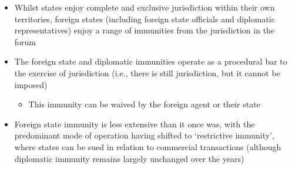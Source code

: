 \begin{itemize}
    \item Whilst states enjoy complete and exclusive jurisdiction within their own territories, foreign states (including foreign state officials and diplomatic representatives) enjoy a range of immunities from the jurisdiction in the forum
    \item The foreign state and diplomatic immunities operate as a procedural bar to the exercise of jurisdiction (i.e., there is still jurisdiction, but it cannot be imposed)
    \begin{itemize}
        \item This immunity can be waived by the foreign agent or their state
    \end{itemize}
    \item Foreign state immunity is less extensive than it once was, with the predominant mode of operation having shifted to `restrictive immunity', where states can be sued in relation to commercial transactions (although diplomatic immunity remains largely unchanged over the years)
\end{itemize}


